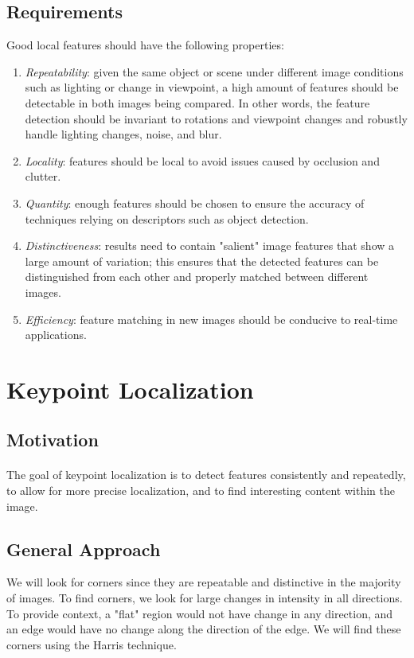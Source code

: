 \documentclass{article}
\begin{document}
\subsection{Requirements}
Good local features should have the following properties:
\begin{enumerate}
\item \textit{Repeatability}: given the same object or scene under different image conditions such as lighting or change in viewpoint, a high amount of features should be detectable in both images being compared. In other words, the feature detection should be invariant to rotations and viewpoint changes and robustly handle lighting changes, noise, and blur.
\item \textit{Locality}: features should be local to avoid issues caused by occlusion and clutter.
\item \textit{Quantity}: enough features should be chosen to ensure the accuracy of techniques relying on descriptors such as object detection.
\item \textit{Distinctiveness}: results need to contain "salient" image features that show a large amount of variation; this ensures that the detected features can be distinguished from each other and properly matched between different images.
\item \textit{Efficiency}: feature matching in new images should be conducive to real-time applications.
\end{enumerate}

\section{Keypoint Localization}
\subsection{Motivation}
\paragraph{} The goal of keypoint localization is to detect features consistently and repeatedly, to allow for more precise localization, and to find interesting content within the image.

\subsection{General Approach}
We will look for corners since they are repeatable and distinctive in the majority of images. To find corners, we look for large changes in intensity in all directions. To provide context, a "flat" region would not have change in any direction, and an edge would have no change along the direction of the edge. We will find these corners using the Harris technique.
\end{document}
